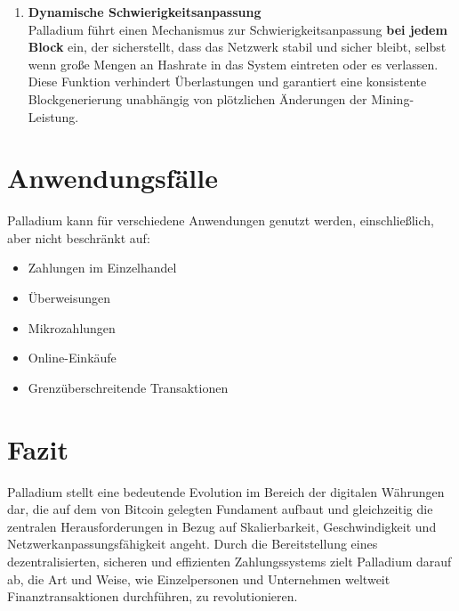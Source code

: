 \documentclass[11pt,a4paper]{article}
\begin{document}
\begin{enumerate}
    \item \textbf{Dynamische Schwierigkeitsanpassung} \\ 
    Palladium führt einen Mechanismus zur Schwierigkeitsanpassung \textbf{bei jedem Block} ein, der sicherstellt, dass das Netzwerk stabil und sicher bleibt, selbst wenn große Mengen an Hashrate in das System eintreten oder es verlassen. Diese Funktion verhindert Überlastungen und garantiert eine konsistente Blockgenerierung unabhängig von plötzlichen Änderungen der Mining-Leistung.
\end{enumerate}

\section{Anwendungsfälle}
Palladium kann für verschiedene Anwendungen genutzt werden, einschließlich, aber nicht beschränkt auf:
\begin{itemize}
    \item Zahlungen im Einzelhandel
    \item Überweisungen
    \item Mikrozahlungen
    \item Online-Einkäufe
    \item Grenzüberschreitende Transaktionen
\end{itemize}

\section{Fazit}
Palladium stellt eine bedeutende Evolution im Bereich der digitalen Währungen dar, die auf dem von Bitcoin gelegten Fundament aufbaut und gleichzeitig die zentralen Herausforderungen in Bezug auf Skalierbarkeit, Geschwindigkeit und Netzwerkanpassungsfähigkeit angeht. Durch die Bereitstellung eines dezentralisierten, sicheren und effizienten Zahlungssystems zielt Palladium darauf ab, die Art und Weise, wie Einzelpersonen und Unternehmen weltweit Finanztransaktionen durchführen, zu revolutionieren.
\end{document}
